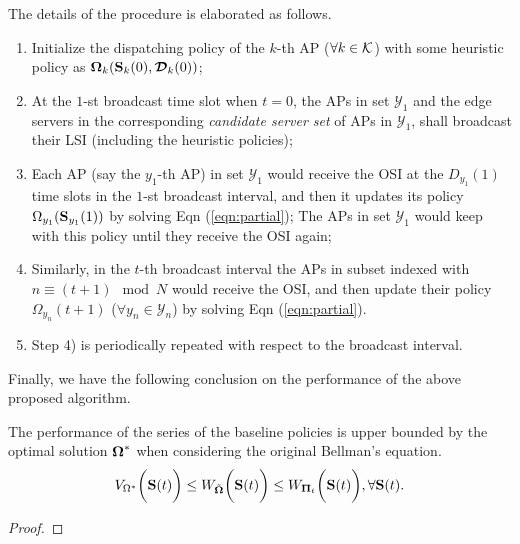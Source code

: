The details of the procedure is elaborated as follows.
\begin{enumerate}
    \item Initialize the dispatching policy of the $k$-th AP ($\forall k\in\mathcal{K}$) with some heuristic policy as $\boldsymbol{\Omega}_{k}(\mathbf{S}_{k}(0), \boldsymbol{\mathcal{D}}_{k}(0))$;
    \item At the $1$-st broadcast time slot when $t=0$, the APs in set $\mathcal{Y}_{1}$ and the edge servers in the corresponding \emph{candidate server set} of APs in $\mathcal{Y}_{1}$, shall broadcast their LSI (including the heuristic policies);
    \item Each AP (say the $y_1$-th AP) in set $\mathcal{Y}_{1}$ would receive the OSI at the $D_{y_1}(1)$ time slots in the $1$-st broadcast interval, and then it updates its policy $\Omega_{y_1}(\mathbf{S}_{y_1}(1))$ by solving Eqn (\ref{eqn:partial}); The APs in set $\mathcal{Y}_{1}$ would keep with this policy until they receive the OSI again;
    \item Similarly, in the $t$-th broadcast interval the APs in subset indexed with $n \equiv (t + 1)\mod{N}$ would receive the OSI, and then update their policy $\Omega_{y_n}(t+1)$ ($\forall y_n\in\mathcal{Y}_{n}$) by solving Eqn (\ref{eqn:partial}).
    \item Step 4) is periodically repeated with respect to the broadcast interval.
\end{enumerate}




Finally, we have the following conclusion on the performance of the above proposed algorithm.
\begin{lemma}[Performance Guarantee]
    The performance of the series of the baseline policies is upper bounded by the optimal solution $\boldsymbol{\Omega}^*$ when considering the original Bellman's equation.
    \begin{align}
        V_{\Omega^*}\bigg(\mathbf{S}(t)\bigg)
        \leq W_{\tilde{\boldsymbol{\Omega}}}\bigg(\mathbf{S}(t)\bigg)
        \leq W_{\boldsymbol{\Pi}_{t}}\bigg(\mathbf{S}(t)\bigg),
        \forall \mathbf{S}(t).
    \end{align}
\end{lemma}
\begin{proof}
    
\end{proof}

